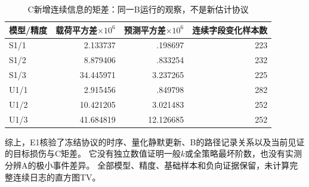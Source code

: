 \begin{table}[ht]
\centering\small
\caption{C新增连续信息的矩差：同一B运行的观察，不是新估计协议}
\label{tab:e1-c}
\begin{tabular}{lrrr}
\toprule
模型/精度 & 载荷平方差$\times10^6$ & 预测平方差$\times10^6$ & 连续字段变化样本数\\
\midrule
S1/1 & 2.133737 & .198697 & 223\\
S1/2 & 8.879406 & .833254 & 232\\
S1/3 & 34.445971 & 3.237265 & 225\\
U1/1 & 2.915456 & .849798 & 282\\
U1/2 & 10.421205 & 3.021483 & 252\\
U1/3 & 41.684819 & 12.126685 & 252\\
\bottomrule
\end{tabular}
\end{table}

综上，E1核验了冻结协议的时序、量化静默更新、B的路径记录关系以及当前见证的目标损伤与C矩差。
它没有独立数值证明一般$k$或全策略最坏阶数，也没有实测分辨A的极小事件差异。
全部模型、精度、基础样本和负向证据保留，未计算完整连续日志的直方图TV。
